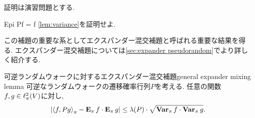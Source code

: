証明は演習問題とする.
\begin{exercise}{}{Epi Pf = f}
    \cref{lem:variance}を証明せよ.
\end{exercise}
この補題の重要な系としてエクスパンダー混交補題と呼ばれる重要な結果を得る.
エクスパンダー混交補題については\cref{sec:expander pseudorandom}でより詳しく紹介する.
\begin{corollary}{可逆ランダムウォークに対するエクスパンダー混交補題}{general expander mixing lemma}
    可逆なランダムウォークの遷移確率行列$P$を考える.
    任意の関数$f,g\in\pispace$に対し,
    \begin{align*}
      \abs*{\piprod{f,Pg} - \Epi f \cdot \Epi g} \le \lambda(P)\cdot \sqrt{\Varpi f \cdot \Varpi g}.
    \end{align*}
\end{corollary}

